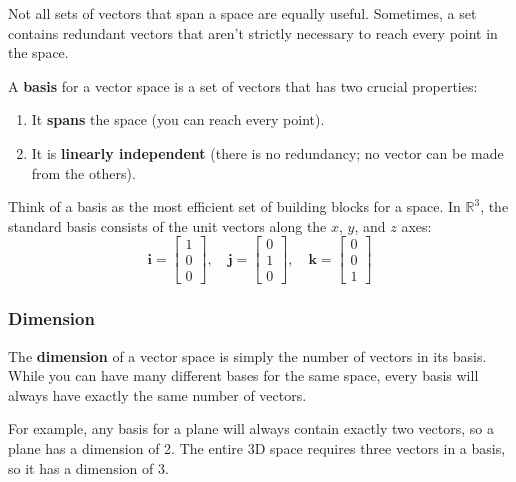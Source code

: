 Not all sets of vectors that span a space are equally useful. Sometimes, a set contains redundant vectors that aren't strictly necessary to reach every point in the space. 

A \textbf{basis} for a vector space is a set of vectors that has two crucial properties:
\begin{enumerate}
    \item It \textbf{spans} the space (you can reach every point).
    \item It is \textbf{linearly independent} (there is no redundancy; no vector can be made from the others).
\end{enumerate}

Think of a basis as the most efficient set of building blocks for a space. In $\mathbb{R}^3$, the standard basis consists of the unit vectors along the $x$, $y$, and $z$ axes:
\[ \mathbf{i} = \begin{bmatrix} 1 \\ 0 \\ 0 \end{bmatrix}, \quad \mathbf{j} = \begin{bmatrix} 0 \\ 1 \\ 0 \end{bmatrix}, \quad \mathbf{k} = \begin{bmatrix} 0 \\ 0 \\ 1 \end{bmatrix} \]

\subsubsection*{Dimension}
The \textbf{dimension} of a vector space is simply the number of vectors in its basis. While you can have many different bases for the same space, every basis will always have exactly the same number of vectors.

For example, any basis for a plane will always contain exactly two vectors, so a plane has a dimension of 2. The entire 3D space requires three vectors in a basis, so it has a dimension of 3.
